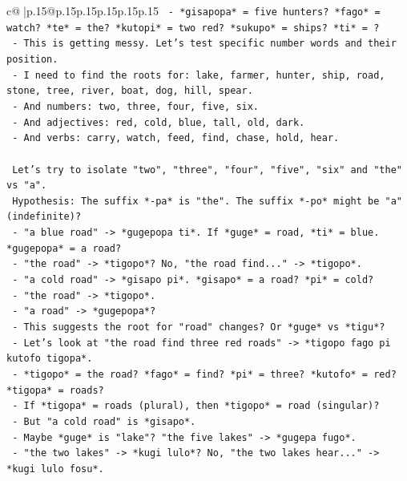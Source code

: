 \documentclass{article}
\begin{document}
{\begin{supertabular}{c@{$\;$}|p{.15\linewidth}@{}p{.15\linewidth}p{.15\linewidth}p{.15\linewidth}p{.15\linewidth}p{.15\linewidth}}
{{{\texttt{         {-} *gisapopa* = five hunters? *fago* = watch? *te* = the? *kutopi* = two red? *sukupo* = ships? *ti* = ?} \\
\texttt{       {-} This is getting messy. Let's test specific number words and their position.} \\
\texttt{       {-} I need to find the roots for: lake, farmer, hunter, ship, road, stone, tree, river, boat, dog, hill, spear.} \\
\texttt{       {-} And numbers: two, three, four, five, six.} \\
\texttt{       {-} And adjectives: red, cold, blue, tall, old, dark.} \\
\texttt{       {-} And verbs: carry, watch, feed, find, chase, hold, hear.} \\
\\ 
\texttt{       Let's try to isolate "two", "three", "four", "five", "six" and "the" vs "a".} \\
\texttt{       Hypothesis: The suffix *{-}pa* is "the". The suffix *{-}po* might be "a" (indefinite)?} \\
\texttt{       {-} "a blue road" {-}> *gugepopa ti*. If *guge* = road, *ti* = blue. *gugepopa* = a road?} \\
\texttt{       {-} "the road" {-}> *tigopo*? No, "the road find..." {-}> *tigopo*.} \\
\texttt{       {-} "a cold road" {-}> *gisapo pi*. *gisapo* = a road? *pi* = cold?} \\
\texttt{       {-} "the road" {-}> *tigopo*.} \\
\texttt{       {-} "a road" {-}> *gugepopa*?} \\
\texttt{       {-} This suggests the root for "road" changes? Or *guge* vs *tigu*?} \\
\texttt{       {-} Let's look at "the road find three red roads" {-}> *tigopo fago pi kutofo tigopa*.} \\
\texttt{         {-} *tigopo* = the road? *fago* = find? *pi* = three? *kutofo* = red? *tigopa* = roads?} \\
\texttt{         {-} If *tigopa* = roads (plural), then *tigopo* = road (singular)?} \\
\texttt{         {-} But "a cold road" is *gisapo*.} \\
\texttt{         {-} Maybe *guge* is "lake"? "the five lakes" {-}> *gugepa fugo*.} \\
\texttt{         {-} "the two lakes" {-}> *kugi lulo*? No, "the two lakes hear..." {-}> *kugi lulo fosu*.} \\
}}}
\end{supertabular}}
\end{document}
